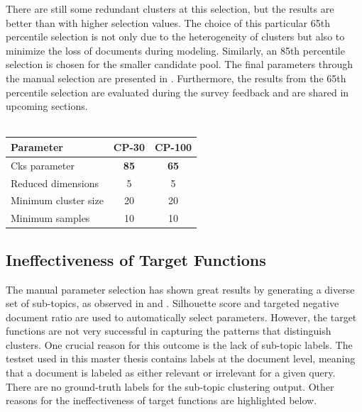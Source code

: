 There are still some redundant clusters at this selection, but the results are better than with higher selection values. The choice of this particular 65th percentile selection is not only due to the heterogeneity of clusters but also to minimize the loss of documents during modeling. Similarly, an 85th percentile selection is chosen for the smaller candidate pool. The final parameters through the manual selection are presented in . Furthermore, the results from the 65th percentile selection are evaluated during the survey feedback and are shared in upcoming sections.
\\
\\
 
 \begin{center}
 	\label{tab:manual_parameter_selection}
 	\begin{tabularx}{.5\textwidth}{|Y|c|c|}
 		\hline
 		Parameter & CP-30 & CP-100 \\
 		\hline
 		
 		Cks parameter & \textbf{85} &         \textbf{65} \\ \hline
 		Reduced dimensions &  5  &       5 \\ \hline
 		Minimum cluster size & 20 &         20 \\ \hline
 		Minimum samples &    10  &     10 \\ \hline
 		
 	\end{tabularx}
 	
 \end{center}
 
 \subsection{Ineffectiveness of Target Functions}
 
The manual parameter selection has shown great results by generating a diverse set of sub-topics, as observed in  and . Silhouette score and targeted negative document ratio are used to automatically select parameters. However, the target functions are not very successful in capturing the patterns that distinguish clusters. One crucial reason for this outcome is the lack of sub-topic labels. The testset used in this master thesis contains labels at the document level, meaning that a document is labeled as either relevant or irrelevant for a given query. There are no ground-truth labels for the sub-topic clustering output. Other reasons for the ineffectiveness of target functions are highlighted below.
 
